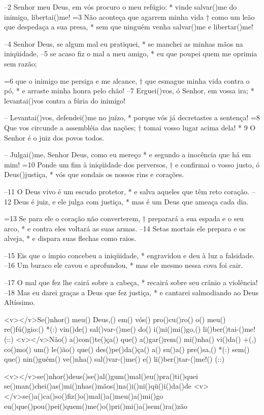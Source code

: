 –2 Senhor meu Deus, em vós procuro o meu refúgio: *
vinde salvar()me do inimigo, libertai()me!
=3 Não aconteça que agarrem minha vida †
como um leão que despedaça a sua presa, *
sem que ninguém venha salvar()me e libertar()me!

–4 Senhor Deus, se algum mal eu pratiquei, *
se manchei as minhas mãos na iniqüidade,
–5 se acaso fiz o mal a meu amigo, *
eu que poupei quem me oprimia sem razão;

=6 que o inimigo me persiga e me alcance, †
que esmague minha vida contra o pó, *
e arraste minha honra pelo chão!
–7 Erguei()vos, ó Senhor, em vossa ira; *
levantai()vos contra a fúria do inimigo!

– Levantai()vos, defendei()me no juízo, *
porque vós já decretastes a sentença!
=8 Que vos circunde a assembléia das nações; †
tomai vosso lugar acima dela! *
9 O Senhor é o juiz dos povos todos.

– Julgai()me, Senhor Deus, como eu mereço *
e segundo a inocência que há em mim!
=10 Ponde um fim à iniqüidade dos perversos, †
e confirmai o vosso justo, ó Deus()justiça, *
vós que sondais os nossos rins e corações.

–11 O Deus vivo é um escudo protetor, *
e salva aqueles que têm reto coração.
–12 Deus é juiz, e ele julga com justiça, *
mas é um Deus que ameaça cada dia.

=13 Se para ele o coração não converterem, †
preparará a sua espada e o seu arco, *
e contra eles voltará as suas armas.
–14 Setas mortais ele prepara e os alveja, *
e dispara suas flechas como raios.

–15 Eis que o ímpio concebeu a iniqüidade, *
engravidou e deu à luz a falsidade.
–16 Um buraco ele cavou e aprofundou, *
mas ele mesmo nessa cova foi cair.

–17 O mal que fez lhe cairá sobre a cabeça, *
recairá sobre seu crânio a violência!
–18 Mas eu darei graças a Deus que fez justiça, *
e cantarei salmodiando ao Deus Altíssimo.

<v></v>Se()nhor() meu() Deus,() em() vós() pro()cu()ro() o() meu() re()fú()gio:() *(:)
vin()de() sal()var-()me() do() i()ni()mi()go,() li()ber()tai-()me!(::)
<v></v>Não() a()con()te()ça() que() a()gar()rem() mi()nha() vi()da() +(,)
co()mo() um() le()ão() que() des()pe()da()ça() a() su()a() pre()sa,() *(:)
sem() que() nin()guém() ve()nha() sal()var-()me() e() li()ber()tar-()me!() (::)

<v></v>se()nhor()deus()se()al()gum()mal()eu()pra()ti()quei
se()man()chei()as()mi()nhas()mãos()na()i()ni()qü()i()da()de
<v></v>se()a()ca()so()fiz()o()mal()a()meu()a()mi()go
eu()que()pou()pei()quem()me()o()pri()mi()a()sem()ra()zão


